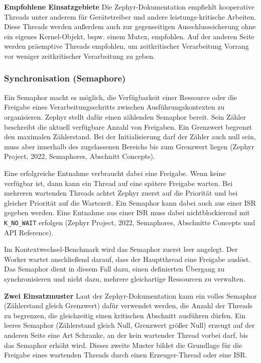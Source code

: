 \textbf{Empfohlene Einsatzgebiete} Die Zephyr-Dokumentation empfiehlt kooperative Threads unter anderem f{\"u}r Ger{\"a}tetreiber und andere leistungs-kritische Arbeiten. Diese Threads werden au{\ss}erdem auch zur gegenseitigen Ausschlusssicherung ohne ein eigenes Kernel-Objekt, bspw. einem Mutex, empfohlen. Auf der anderen Seite werden pr{\"a}emptive Threads empfohlen, um zeitkritischer Verarbeitung Vorrang vor weniger zeitkritischer Verarbeitung zu geben.

\subsubsection{Synchronisation (Semaphore)}
Ein Semaphor macht es m{\"o}glich, die Verf{\"u}gbarkeit einer Ressource oder die Freigabe eines Verarbeitungsschritts zwischen Ausf{\"u}hrungskontexten zu organisieren. Zephyr stellt daf{\"u}r einen z{\"a}hlenden Semaphor bereit. Sein Z{\"a}hler beschreibt die aktuell verf{\"u}gbare Anzahl von Freigaben. Ein Grenzwert begrenzt den maximalen Z{\"a}hlerstand. Bei der Initialisierung darf der Z{\"a}hler auch null sein, muss aber innerhalb des zugelassenen Bereichs bis zum Grenzwert liegen (Zephyr Project, 2022, \glqq{}Semaphores\grqq{}, Abschnitt \glqq{}Concepts\grqq{}).

Eine erfolgreiche Entnahme verbraucht dabei eine Freigabe. Wenn keine verf{\"u}gbar ist, dann kann ein Thread auf eine sp{\"a}tere Freigabe warten. Bei mehreren wartenden Threads achtet Zephyr zuerst auf die Priorit{\"a}t und bei gleicher Priorit{\"a}t auf die Wartezeit. Ein Semaphor kann dabei auch aus einer ISR gegeben werden. Eine Entnahme aus einer ISR muss dabei nichtblockierend mit \lstinline[style=fileinline]|K_NO_WAIT| erfolgen (Zephyr Project, 2022, \glqq{}Semaphores\grqq{}, Abschnitte \glqq{}Concepts\grqq{} und \glqq{}API Reference\grqq{}).

Im Kontextwechsel-Benchmark wird das Semaphor zuerst leer angelegt. Der Worker wartet anschlie{\ss}end darauf, dass der Hauptthread eine Freigabe ausl{\"o}st. Das Semaphor dient in diesem Fall dazu, einen definierten {\"U}bergang zu synchronisieren und nicht dazu, mehrere gleichartige Ressourcen zu verwalten.

\textbf{Zwei Einsatzmuster} Laut der Zephyr-Dokumentation kann ein \glqq{}volles\grqq{} Semaphor (Z{\"a}hlerstand gleich Grenzwert) daf{\"u}r verwendet werden, die Anzahl der Threads zu begrenzen, die gleichzeitig einen kritischen Abschnitt ausf{\"u}hren d{\"u}rfen. Ein \glqq{}leeres\grqq{} Semaphor (Z{\"a}hlerstand gleich Null, Grenzwert gr{\"o}{\ss}er Null) erzeugt auf der anderen Seite eine Art Schranke, an der kein wartender Thread vorbei darf, bis das Semaphor erh{\"o}ht wird. Dieses zweite Muster bildet die Grundlage f{\"u}r die Freigabe eines wartenden Threads durch einen Erzeuger-Thread oder eine ISR.

